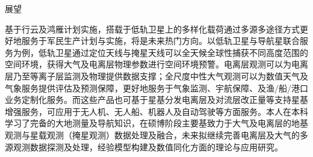 \begin{rubric}{展望}

\entry*[]基于行云及鸿雁计划实施，搭载于低轨卫星上的多样化载荷通过多源多途径方式更好地服务于军民生产计划与实施，将是未来热门方向。以低轨卫星与导航星联合服务为例，低轨卫星通过定位天线与掩星天线可以全天候全球性捕获不同高度范围的空间环境，获得大气及电离层物理参数进行空间环境预警。电离层观测可以为电离层乃至等离子层监测及物理提供数据支撑；全尺度中性大气观测可以为数值天气及气象服务提供评估及预测保障，更好地服务于气象监测、宇航保障、及渔/船/港口业务定制化服务。而这些产品也可基于星基分发电离层及对流层改正量等支持星基增强服务，可应用于无人机、无人船、机器人及自动驾驶等方面服务。本人在本科学习了完备的大地测量及导航知识，在硕博阶段主要基致力于大气及电离层的地基观测与星载观测（掩星观测）数据处理及融合，未来拟继续完善电离层及大气的多源观测数据探测及处理，经验模型构建及数值同化方面的理论与应用研究。

\end{rubric}